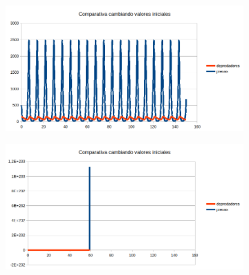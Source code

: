 \documentclass[12pt,a4paper]{article}
\begin{document}
\begin{figure}[H]
	\centering
	\begin{subfigure}{.5\textwidth}
		\centering
	\includegraphics[width=1\linewidth]{images/ejercicio5_5_1}
		\caption{}
	\label{fig:ejercicio551}
	\end{subfigure}%
	\begin{subfigure}{.5\textwidth}
		\centering
	\includegraphics[width=1\linewidth]{images/ejercicio5_1_2}
		\caption{}
	\label{fig:ejercicio512}
	\end{subfigure}
	
	\label{fig:ejercicio51}
\end{figure}
\end{document}
